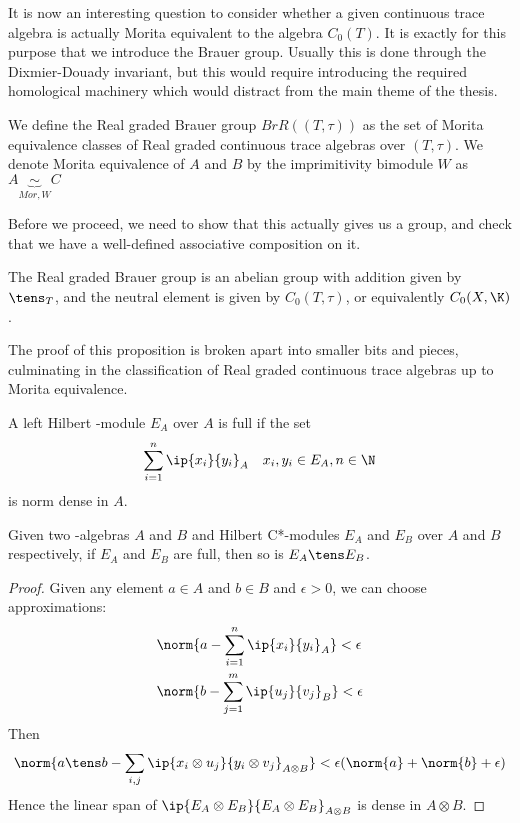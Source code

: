 It is now an interesting question to consider whether a given continuous trace algebra is actually Morita equivalent to the algebra $C_0(T)$. It is exactly for this purpose that we introduce the Brauer group. Usually this is done through the Dixmier-Douady invariant, but this would require introducing the required homological machinery which would distract from the main theme of the thesis. 
\begin{definition}
	We define the Real graded Brauer group $BrR((T,\tau))$ as the set of Morita equivalence classes of Real graded continuous trace algebras over $(T,\tau)$. We denote Morita equivalence of $A$ and $B$  by the imprimitivity bimodule $W$ as $A\underbrace{\sim}_{Mor,W} C$
\end{definition}
Before we proceed, we need to show that this actually gives us a group, and check that we have a well-defined associative composition on it.	
\begin{proposition}
	The Real graded Brauer group is an abelian group with addition given by $\tens_T$, and the neutral element is given by $C_0(T,\tau)$, or equivalently $C_0(X,\K)$.
\end{proposition}
The proof of this proposition is broken apart into smaller bits and pieces, culminating in the classification of Real graded continuous trace algebras up to Morita equivalence. 
\begin{definition}
A left Hilbert \Cstar-module $E_A$ over $A$ is full if the set
\begin{align*}
\sum_{i=1}^{n} \ip{x_i}{y_i}_A \quad x_i,y_i\in E_A,n\in \N
\end{align*}
is norm dense in $A$. 
\end{definition}


\begin{lemma}
	Given two \Cstar-algebras $A$ and $B$ and Hilbert C*-modules $E_A$ and $E_B$ over $A$ and $B$ respectively, if $E_A$ and $E_B$ are full, then so is $E_A\tens E_B$. 
\end{lemma}
\begin{proof}

Given any element $a\in A$ and $b\in B$ and $\epsilon >0$, we can choose approximations:
\begin{align*}
&\norm{a- \sum_{i=1}^n \ip{x_i}{ y_i}_A}<\epsilon \\
 &\norm{b- \sum_{j=1}^m \ip{u_j}{v_j}_B}<\epsilon 
\end{align*}
Then
\begin{align*}
\norm{a\tens b- \sum_{i,j} \ip{x_i\otimes u_j}{ y_i\otimes v_j}_{A\otimes B}}<\epsilon(\norm{a}+\norm{b}+\epsilon)
\end{align*}
Hence the linear span of $\ip{E_A\otimes E_B}{ E_A\otimes E_B}_{A\otimes B}$ is dense in  $A\otimes B$.
\end{proof}

